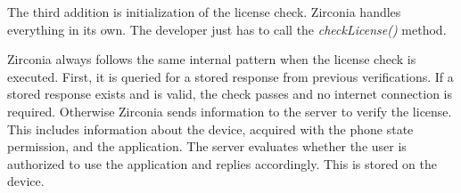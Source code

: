 The third addition is initialization of the license check.
Zirconia handles everything in its own.
The developer just has to call the \textit{checkLicense()} method.
\newline

Zirconia always follows the same internal pattern when the license check is executed.
First, it is queried for a stored response from previous verifications.
If a stored response exists and is valid, the check passes and no internet connection is required.
Otherwise Zirconia sends information to the server to verify the license.
This includes information about the device, acquired with the phone state permission, and the application.
The server evaluates whether the user is authorized to use the application and replies accordingly.
This is stored on the device. \cite{samsungZirconia}
